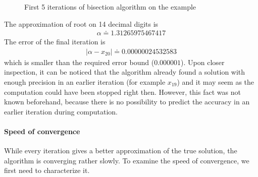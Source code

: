 \documentclass[
  digital, %
  notable,   %
  nolof,     %
  nolot,     %
	draft, %
]{fithesis3}
\begin{document}
\begin{figure}
\centering
\def\FunctionF(#1){2*(#1)^4-3*(#1)-2}%
\caption{First 5 iterations of bisection algorithm on the example} \label{fig:bisp}
\end{figure}

The approximation of root on 14 decimal digits is
\begin{align}
      \alpha \doteq 1.31265975467417
\end{align}
The error of the final iteration is
\begin{align}
      |\alpha - x_{20}| \doteq 0.00000024532583
\end{align}
which is smaller than the required error bound ($0.000001$). Upon closer inspection, it can be noticed that the algorithm already found a solution with enough precision in an earlier iteration (for example $x_{19}$) and it may seem as the computation could have been stopped right then. However, this fact was not known beforehand, because there is no possibility to predict the accuracy in an earlier iteration during computation.

\paragraph{Speed of convergence}
While every iteration gives a better approximation of the true solution, the algorithm is converging rather slowly. To examine the speed of convergence, we first need to characterize it.
\end{document}
